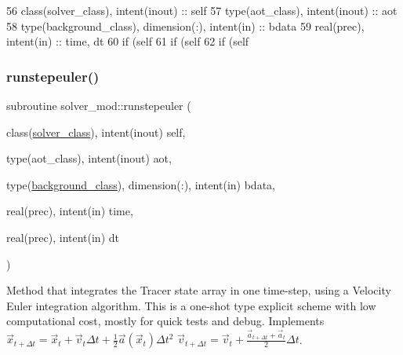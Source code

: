 \begin{DoxyCode}
56     \textcolor{keywordtype}{class}(solver\_class), \textcolor{keywordtype}{intent(inout)} :: self
57     \textcolor{keywordtype}{type}(aot\_class), \textcolor{keywordtype}{intent(inout)} :: aot
58     \textcolor{keywordtype}{type}(background\_class), \textcolor{keywordtype}{dimension(:)}, \textcolor{keywordtype}{intent(in)} :: bdata
59     \textcolor{keywordtype}{real(prec)}, \textcolor{keywordtype}{intent(in)} :: time, dt
60     \textcolor{keywordflow}{if} (self%
61     \textcolor{keywordflow}{if} (self%
62     \textcolor{keywordflow}{if} (self%
\end{DoxyCode}
\mbox{\label{namespacesolver__mod_a1c6bb2899a5ce28d6b63f1d0e67d2b92}} 
\subsubsection{\texorpdfstring{runstepeuler()}{runstepeuler()}}
{\footnotesize\ttfamily subroutine solver\+\_\+mod\+::runstepeuler (\begin{DoxyParamCaption}\item[{class(\mbox{\hyperlink{structsolver__mod_1_1solver__class}{solver\+\_\+class}}), intent(inout)}]{self,  }\item[{type(aot\+\_\+class), intent(inout)}]{aot,  }\item[{type(\mbox{\hyperlink{structbackground__mod_1_1background__class}{background\+\_\+class}}), dimension(\+:), intent(in)}]{bdata,  }\item[{real(prec), intent(in)}]{time,  }\item[{real(prec), intent(in)}]{dt }\end{DoxyParamCaption})\hspace{0.3cm}{\ttfamily [private]}}



Method that integrates the Tracer state array in one time-\/step, using a Velocity Euler integration algorithm. This is a one-\/shot type explicit scheme with low computational cost, mostly for quick tests and debug. Implements $ {\vec {x}}_{t+\Delta t}={\vec {x}}_{t}+{\vec {v}}_{t}\Delta t+{\frac {1}{2}}{\vec {a}}({\vec {x}}_{t})\Delta t^{2}$ $ {\vec {v}}_{t+\Delta t}={\vec {v}}_{t}+\frac{{\vec {a}}_{t+\Delta t}+{\vec {a}}_{t}}{2}\Delta t$. 

